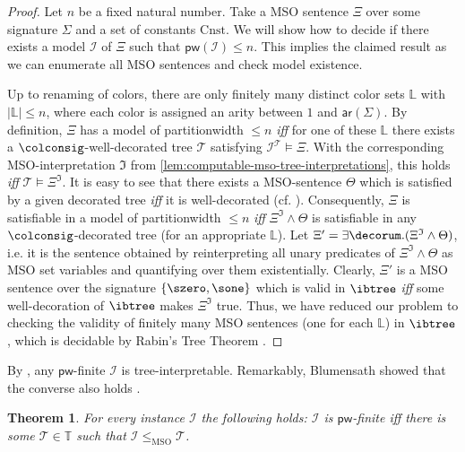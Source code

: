 \documentclass[10pt,a4paper]{amsart}
\theoremstyle{definition}
\numberwithin{equation}{section}
\theoremstyle{plain}
\newtheorem{theorem}[theorem]{Theorem}
\theoremstyle{definition}
\theoremstyle{myexample}
\theoremstyle{plain}
\theoremstyle{definition}
\newcommand{\instance}{\mathcal{I}}
\newcommand{\inst}{\instance}
\newcommand{\cols}{\mathbb{L}}
\newcommand{\arity}[1]{\fcn{ar}(#1)}
\newcommand{\ercw}[1]{\pw{#1}}
\newcommand{\pw}[1]{\fcn{pw}(#1)}
\newcommand{\fcn}[1]{\mathsf{#1}}
\newcommand{\iffi}{\textit{iff} } %
\begin{document}
\begin{proof}
Let $n$ be a fixed natural number. Take a MSO sentence $\Xi$ over some signature $\Sigma$ and a set of constants $\mathrm{Cnst}$. We will show how to decide if there exists a model $\inst$ of $\Xi$ such that $\ercw{\inst} \leq n$. This implies the claimed result as we can enumerate all MSO sentences and check model existence.%

Up to renaming of colors, there are only finitely many distinct color sets $\cols$ with $|\cols| \leq n$, where each color is assigned an arity between $1$ and $\arity{\Sigma}$. 
By definition, $\Xi$ has a model of partitionwidth $\leq n$ \iffi for one of these $\cols$ there exists a $\colconsig$-well-decorated tree $\mathcal{T}$ satisfying $\inst^\mathcal{T} \models \Xi$. With the corresponding MSO-interpretation $\mathfrak{I}$ from \cref{lem:computable-mso-tree-interpretations}, this holds \iffi $\mathcal{T} \models \Xi^\mathfrak{I}$.
It is easy to see that there exists a MSO-sentence $\Theta$ which is satisfied by a given decorated tree \iffi it is well-decorated (cf. ).
Consequently, $\Xi$ is satisfiable in a model of partitionwidth $\leq n$ \iffi $\Xi^\mathfrak{I}\wedge \Theta$ is satisfiable in any $\colconsig$-decorated tree (for an appropriate $\cols$).
Let $\Xi' = \exists \decorum. (\Xi^\mathfrak{I}\wedge \Theta)$, i.e. it is the sentence obtained by reinterpreting all unary predicates of $\Xi^{\mathfrak{I}}\wedge \Theta$ as MSO set variables and quantifying over them existentially. Clearly, $\Xi'$ is a MSO sentence over the signature $\{\szero,\sone\}$ which is valid in $\ibtree$ \iffi some well-decoration of $\ibtree$ makes $\Xi^{\mathfrak{I}}$ true. Thus, we have reduced our problem to checking the validity of finitely many MSO sentences (one for each $\cols$) in $\ibtree$, which is decidable by Rabin's Tree Theorem \cite[Thm 1.1]{Rabin69}.
\end{proof}


By , any $\fcn{pw}$-finite $\instance$ is tree-interpretable.
Remarkably, Blumensath showed that the converse also holds \cite[Thm. 41]{Blumensath06}.

\begin{theorem}\label{thm:pw-coincides-mso-interpretability-trees} For every instance $\inst$ the following holds:
$\instance$ is $\fcn{pw}$-finite \iffi there is some  $\mathcal{T} \in \mathbb{T}$ such that $\instance \leq_{\text{MSO}} \mathcal{T}$.   
\end{theorem}
\end{document}
